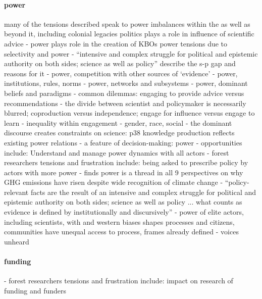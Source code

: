 \paragraph{power}
\cite{OjanenBKP2021} many of the tensions described speak to power imbalances within the \SPI{} as well as beyond it, including colonial legacies
\cite{IbarraJOBCIMRS2022} politics plays a role in influence of scientific advice
\cite{MacKillopCDD2023} - power plays role in the creation of KBOs
power \cite{MacKillopCDD2023}
\cite{StrassheimK2014} tensions due to selectivity and power - ``intensive and complex struggle for political and epistemic authority on both sides; science as well as policy''
\cite{OlejniczakBDP2019} describe the s-p gap and reasons for it
\cite{CairneyO2020} - power, competition with other sources of `evidence'
\cite{CairneyO2020} - power, institutions, rules, norms
\cite{CairneyO2020} - power, networks and subsystems
\cite{CairneyO2020} - power, dominant beliefs and paradigms
\cite{CairneyO2020} - common dilemmas: engaging to provide advice versus recommendations - the divide between scientist and policymaker is necessarily blurred; coproduction versus independence; engage for influence versus engage to learn 
\cite{CairneyO2020} - inequality within engagement - gender, race, social
\cite{Carton2021} - the dominant discourse creates constraints on science: p38 knowledge production reflects existing power relations
\cite{MoallemiZHSMZHKHMGLB2023} - a feature of decision-making: power
\cite{MoallemiZHSMZHKHMGLB2023} - opportunities include: Understand and manage power dynamics with all actors
\cite{OjanenBKP2021} - forest researchers tensions and frustration include: being asked to prescribe policy by actors with more power
\cite{StoddardEtAl2021} - finds power is a thread in all 9 perspectives on why GHG emissions have risen despite wide recognition of climate change
\cite{StrassheimK2014} - ``policy-relevant facts are the result of an intensive and complex struggle for political and epistemic authority on both sides; science as well as policy ... what counts as evidence is defined by institutionally and discursively''
\cite{TurnhoutMWKL2020} - power of elite actors, including scientists, with and western biases shapes processes and citizens, communities have unequal access to process, frames already defined - voices unheard 

\paragraph{funding}
\cite{OjanenBKP2021} - forest researchers tensions and frustration include: impact on research of funding and funders

